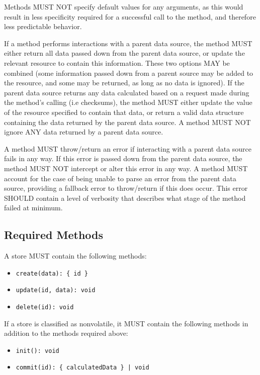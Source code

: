 \documentclass{article}
\begin{document}
Methods MUST NOT specify default values for any arguments, as this would result in less specificity required for a successful call to the method, and therefore less predictable behavior. 

If a method performs interactions with a parent data source, the method MUST either return all data passed down from the parent data source, or update the relevant resource to contain this information. These two options MAY be combined (some information passed down from a parent source may be added to the resource, and some may be returned, as long as no data is ignored). If the parent data source returns any data calculated based on a request made during the method's calling (i.e checksums), the method MUST either update the value of the resource specified to contain that data, or return a valid data structure containing the data returned by the parent data source. A method MUST NOT ignore ANY data returned by a parent data source.

A method MUST throw/return an error if interacting with a parent data source fails in any way. If this error is passed down from the parent data source, the method MUST NOT intercept or alter this error in any way. A method MUST account for the case of being unable to parse an error from the parent data source, providing a fallback error to throw/return if this does occur. This error SHOULD contain a level of verbosity that describes what stage of the method failed at minimum.

\subsection{Required Methods}
A store MUST contain the following methods:
\begin{itemize}
    \item \verb|create(data): { id }|
    \item \verb|update(id, data): void|
    \item \verb|delete(id): void|
\end{itemize}
\newpage
If a store is classified as nonvolatile, it MUST contain the following methods in addition to the methods required above:
\begin{itemize}
    \item \verb|init(): void|
    \item \begin{verbatim}commit(id): { calculatedData } | void\end{verbatim}
\end{itemize}
\end{document}
